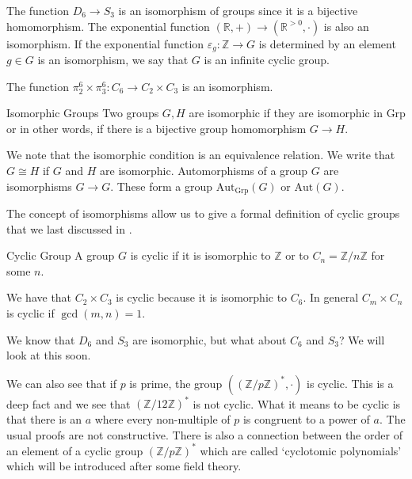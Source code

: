 \documentclass{report}
\begin{document}
\begin{examples}
    \begin{example}[\label{exm:2.4.4}]
        The function $D_{6} \rightarrow S_{3}$ is an isomorphism of groups since it is a bijective homomorphism. The exponential function $(\mathbb{R}, +) \rightarrow (\mathbb{R}^{> 0}, \cdot )$ is also an isomorphism. If the exponential function $\varepsilon_{g} : \mathbb{Z} \rightarrow G$ is determined by an element $g \in G$ is an isomorphism, we say that $G$ is an infinite cyclic group.

        The function $\pi^{6}_{2} \times \pi^{6}_{3} : C_{6} \rightarrow C_{2} \times C_{3}$ is an isomorphism.
    \end{example}
\end{examples}

\begin{definition}[\label{def:2.4.5}]{Isomorphic Groups}
    Two groups $G, H$ are isomorphic if they are isomorphic in $\text{Grp}$ or in other words, if there is a bijective group homomorphism $G \rightarrow H$.
\end{definition}

We note that the isomorphic condition is an equivalence relation. We write that $G \cong H$ if $G$ and $H$ are isomorphic. Automorphisms of a group $G$ are isomorphisms $G \rightarrow G$. These form a group $\text{Aut}_{\text{Grp}}(G)$ or $\text{Aut}(G)$.

\begin{examples}
    \begin{example}[\label{exm:2.4.6}]
        The concept of isomorphisms allow us to give a formal definition of cyclic groups that we last discussed in .
    \end{example}
\end{examples}

\begin{definition}[\label{def:2.4.7}]{Cyclic Group}
    A group $G$ is cyclic if it is isomorphic to $\mathbb{Z}$ or to $C_{n} = \mathbb{Z}/n\mathbb{Z}$ for some $n$.
\end{definition}

We have that $C_{2} \times C_{3}$ is cyclic because it is isomorphic to $C_{6}$. In general $C_{m} \times C_{n}$ is cyclic if $\gcd(m, n) = 1$.

We know that $D_{6}$ and $S_{3}$ are isomorphic, but what about $C_{6}$ and $S_{3}$? We will look at this soon.

We can also see that if $p$ is prime, the group $((\mathbb{Z}/p\mathbb{Z})^{*}, \cdot )$ is cyclic. This is a deep fact and we see that $(\mathbb{Z}/12\mathbb{Z})^{*}$ is not cyclic. What it means to be cyclic is that there is an $a$ where every non-multiple of $p$ is congruent to a power of $a$. The usual proofs are not constructive. There is also a connection between the order of an element of a cyclic group $(\mathbb{Z}/p\mathbb{Z})^{*}$ which are called `cyclotomic polynomials' which will be introduced after some field theory.
\end{document}
